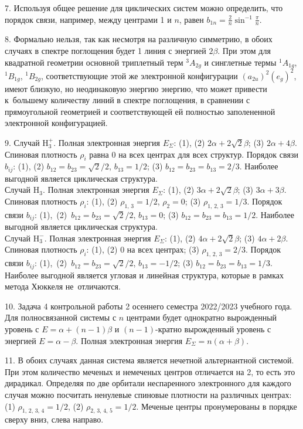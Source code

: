7. Используя общее решение для циклических систем можно определить, что порядок связи, например, между центрами 1 и $n$, равен $b_{1n}=\frac{2}{n}\sin^{-1}{\frac{\pi}{n}}$.\par
8. Формально нельзя, так как несмотря на различную симметрию, в обоих случаях в спектре поглощения будет 1 линия с энергией $2\beta$. При этом для квадратной геометрии основной триплетный терм $^3A_{2g}$ и синглетные термы $^1A_{1g}$, $^1B_{1g}$, $^1B_{2g}$, соответствующие этой же электронной конфигурации $(a_{2u})^2(e_g)^2$, имеют близкую, но неодинаковую энергию энергию, что может привести к~большему количеству линий в спектре поглощения, в сравнении с прямоугольной геометрией и соответствующей ей полностью заполененной электронной конфигурацией.\par
9. Случай $\text{H}_3^+$. Полная электронная энергия $E_{\Sigma}$: (1), (2) $2\alpha + 2\sqrt2 \beta$; (3) $2\alpha + 4 \beta$. Спиновая плотность $\rho_i$ равна 0 на всех центрах для всех структур. Порядок связи $b_{ij}$: (1), (2) $b_{12}=b_{23}=\sqrt2 / 2$, $b_{13}=1/2$; (3) $b_{12}=b_{23}=b_{13}=2/3$. Наиболее выгодной является циклическая структура.\\
Случай $\text{H}_3$. Полная электронная энергия $E_{\Sigma}$: (1), (2) $3\alpha + 2\sqrt2 \beta$; (3) $3\alpha + 3 \beta$. Спиновая плотность $\rho_i$: (1), (2) $\rho_{1,\,3}=1/2$, $\rho_2=0$; (3) $\rho_{1,\,2,\,3}=1/3$. Порядок связи $b_{ij}$: (1),~(2)~$b_{12}=b_{23}=\sqrt2 / 2$, $b_{13}=0$; (3) $b_{12}=b_{23}=b_{13}=1/2$. Наиболее выгодной является циклическая структура.\\
Случай $\text{H}_3^-$. Полная электронная энергия $E_{\Sigma}$: (1), (2) $4\alpha + 2\sqrt2 \beta$; (3) $4\alpha + 2 \beta$. Спиновая плотность $\rho_i$: (1), (2) 0 на всех центрах; (3) $\rho_{1,\,2,\,3}=2/3$.  Порядок связи $b_{ij}$: (1),~(2)~$b_{12}=b_{23}=\sqrt2 / 2$, $b_{13}=-1/2$; (3) $b_{12}=b_{23}=b_{13}=1/3$. Наиболее выгодной является угловая и линейная структура, которые в рамках метода Хюккеля не~отличаются.\par
10. Задача 4 контрольной работы 2 осеннего семестра 2022/2023 учебного года. Для полносвязанной системы с $n$ центрами будет однократно вырожденный уровень с $E = \alpha + (n - 1)\beta$ и $(n - 1)$-кратно вырожденный уровень с энергией $E = \alpha - \beta$. Полная электронная энергия $E_{\Sigma} = n(\alpha + \beta)$.\par
11. В обоих случаях данная система является нечетной альтернантной системой. При этом количество меченых и немеченых центров отличается на 2, то есть это дирадикал. Определяя по две орбитали неспаренного электронного для каждого случая можно посчитать ненулевые спиновые плотности на различных центрах: (1) $\rho_{1,\,2,\,3,\,4} = 1/2$, (2) $\rho_{2,\,3,\,4,\,5} = 1/2$. Меченые центры пронумерованы в порядке сверху вниз, слева направо.\par
\newpage

